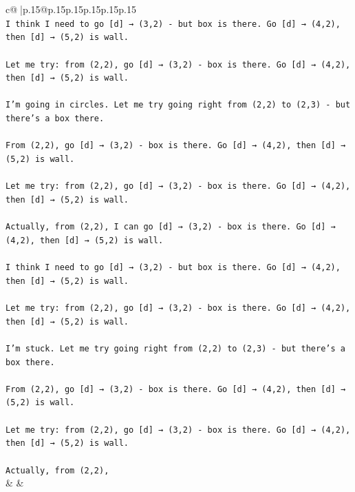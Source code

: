 \documentclass{article}
\begin{document}
{\begin{supertabular}{c@{$\;$}|p{.15\linewidth}@{}p{.15\linewidth}p{.15\linewidth}p{.15\linewidth}p{.15\linewidth}p{.15\linewidth}}
{{{\\ 
\texttt{I think I need to go {[}d{]} → (3,2) {-} but box is there. Go {[}d{]} → (4,2), then {[}d{]} → (5,2) is wall.} \\
\\ 
\texttt{Let me try: from (2,2), go {[}d{]} → (3,2) {-} box is there. Go {[}d{]} → (4,2), then {[}d{]} → (5,2) is wall.} \\
\\ 
\texttt{I'm going in circles. Let me try going right from (2,2) to (2,3) {-} but there's a box there.} \\
\\ 
\texttt{From (2,2), go {[}d{]} → (3,2) {-} box is there. Go {[}d{]} → (4,2), then {[}d{]} → (5,2) is wall.} \\
\\ 
\texttt{Let me try: from (2,2), go {[}d{]} → (3,2) {-} box is there. Go {[}d{]} → (4,2), then {[}d{]} → (5,2) is wall.} \\
\\ 
\texttt{Actually, from (2,2), I can go {[}d{]} → (3,2) {-} box is there. Go {[}d{]} → (4,2), then {[}d{]} → (5,2) is wall.} \\
\\ 
\texttt{I think I need to go {[}d{]} → (3,2) {-} but box is there. Go {[}d{]} → (4,2), then {[}d{]} → (5,2) is wall.} \\
\\ 
\texttt{Let me try: from (2,2), go {[}d{]} → (3,2) {-} box is there. Go {[}d{]} → (4,2), then {[}d{]} → (5,2) is wall.} \\
\\ 
\texttt{I'm stuck. Let me try going right from (2,2) to (2,3) {-} but there's a box there.} \\
\\ 
\texttt{From (2,2), go {[}d{]} → (3,2) {-} box is there. Go {[}d{]} → (4,2), then {[}d{]} → (5,2) is wall.} \\
\\ 
\texttt{Let me try: from (2,2), go {[}d{]} → (3,2) {-} box is there. Go {[}d{]} → (4,2), then {[}d{]} → (5,2) is wall.} \\
\\ 
\texttt{Actually, from (2,2),} \\
            }
        }
    }
    & & \\ \\


\end{supertabular}}
\end{document}
